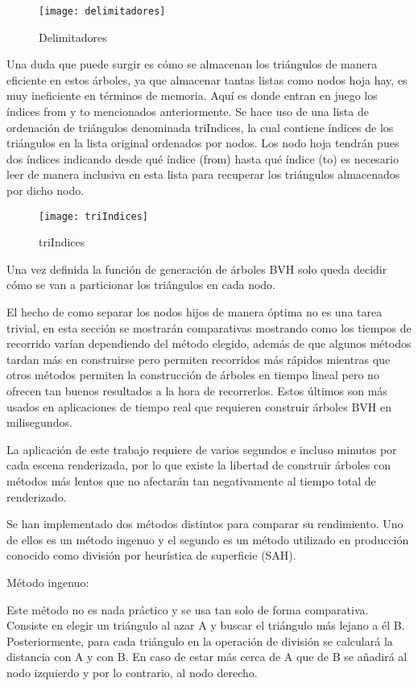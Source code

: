 \begin{figure}
    \centering
	\texttt{[image: delimitadores]}
	\caption{Delimitadores}
	\label{fig:label}
\end{figure}


Una duda que puede surgir es cómo se almacenan los triángulos de manera eficiente en estos árboles, ya que almacenar tantas listas como nodos hoja hay, es muy ineficiente en términos de memoria. Aquí es donde entran en juego los índices from y to mencionados anteriormente. Se hace uso de una lista de ordenación de triángulos denominada triIndices, la cual contiene índices de los triángulos en la lista original ordenados por nodos. Los nodo hoja tendrán pues dos índices indicando desde qué índice (from) hasta qué índice (to) es necesario leer de manera inclusiva en esta lista para recuperar los triángulos almacenados por dicho nodo.

\begin{figure}
    \centering
	\texttt{[image: triIndices]}
	\caption{triIndices}
	\label{fig:label}
\end{figure}

Una vez definida la función de generación de árboles BVH solo queda decidir cómo se van a particionar los triángulos en cada nodo.

El hecho de como separar los nodos hijos de manera óptima no es una tarea trivial, en esta sección se mostrarán comparativas mostrando como los tiempos de recorrido varían dependiendo del método elegido, además de que algunos métodos tardan más en construirse pero permiten recorridos más rápidos mientras que otros métodos permiten la construcción de árboles en tiempo lineal pero no ofrecen tan buenos resultados a la hora de recorrerlos. Estos últimos son más usados en aplicaciones de tiempo real que requieren construir árboles BVH en milisegundos.

La aplicación de este trabajo requiere de varios segundos e incluso minutos por cada escena renderizada, por lo que existe la libertad de construir árboles con métodos más lentos que no afectarán tan negativamente al tiempo total de renderizado.

Se han implementado dos métodos distintos para comparar su rendimiento. Uno de ellos es un método ingenuo y el segundo es un método utilizado en producción conocido como división por heurística de superficie (SAH).

Método ingenuo:

Este método no es nada práctico y se usa tan solo de forma comparativa. Consiste en elegir un triángulo al azar A y buscar el triángulo más lejano a él B. Posteriormente, para cada triángulo en la operación de división se calculará la distancia con A y con B. En caso de estar más cerca de A que de B se añadirá al nodo izquierdo y por lo contrario, al nodo derecho.


